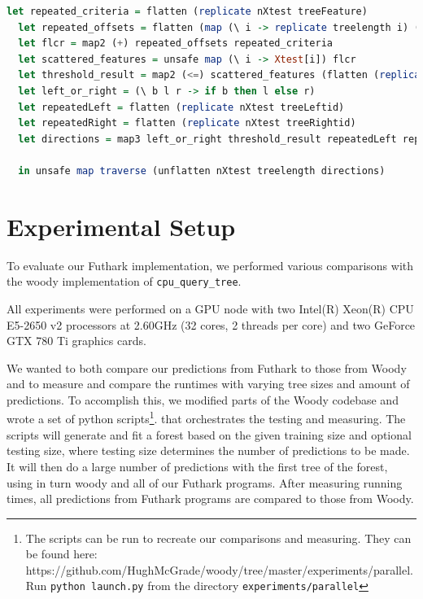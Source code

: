 \documentclass[a4paper]{article}
\begin{document}
\vspace{1ex}
\begin{lrbox}{\lstboxfive}
\begin{minipage}{\textwidth}
\begin{lstlisting}[language=Haskell, breaklines]
let repeated_criteria = flatten (replicate nXtest treeFeature)
  let repeated_offsets = flatten (map (\ i -> replicate treelength i) (steps 0 nXtest dXtest))
  let flcr = map2 (+) repeated_offsets repeated_criteria
  let scattered_features = unsafe map (\ i -> Xtest[i]) flcr
  let threshold_result = map2 (<=) scattered_features (flatten (replicate nXtest treeThres_or_leaf))
  let left_or_right = (\ b l r -> if b then l else r)
  let repeatedLeft = flatten (replicate nXtest treeLeftid)
  let repeatedRight = flatten (replicate nXtest treeRightid)
  let directions = map3 left_or_right threshold_result repeatedLeft repeatedRight

  in unsafe map traverse (unflatten nXtest treelength directions)
\end{lstlisting}
\end{minipage}
\end{lrbox}
\vspace{1ex}

\colorbox{lightgray}{\usebox\lstboxfive}


\section{Experimental Setup}
To evaluate our Futhark implementation, we performed various comparisons with the woody implementation of \verb!cpu_query_tree!.

All experiments were performed on a GPU node with two Intel(R) Xeon(R) CPU E5-2650 v2 processors at 2.60GHz (32 cores, 2 threads per core) and two GeForce GTX 780 Ti graphics cards.

We wanted to both compare our predictions from Futhark to those from Woody and to measure and compare the runtimes with varying tree sizes and amount of predictions.
To accomplish this, we modified parts of the Woody codebase and wrote a set of python scripts\footnote{The scripts can be run to recreate our comparisons and measuring. They can be found here: https://github.com/HughMcGrade/woody/tree/master/experiments/parallel. Run \texttt{python launch.py} from the directory \texttt{experiments/parallel}}. that orchestrates the testing and measuring.
The scripts will generate and fit a forest based on the given training size and optional testing size, where testing size determines the number of predictions to be made. It will then do a large number of predictions with the first tree of the forest, using in turn woody and all of our Futhark programs. After measuring running times, all predictions from Futhark programs are compared to those from Woody.
\end{document}
